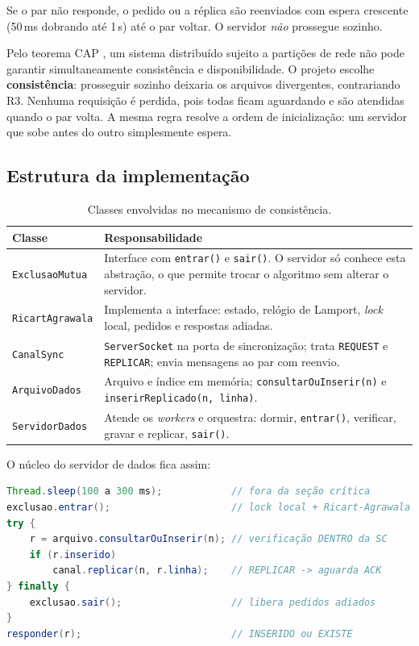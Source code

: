 \documentclass[11pt,a4paper]{article}
\newcommand{\msg}[1]{\texttt{#1}}
\newcommand{\classe}[1]{\texttt{#1}}
\begin{document}
Se o par não responde, o pedido ou a réplica são reenviados com espera crescente
(50\,ms dobrando até 1\,s) até o par voltar. O servidor \emph{não} prossegue
sozinho.

Pelo teorema CAP \cite{brewer2000,gilbert2002}, um sistema distribuído sujeito a
partições de rede não pode garantir simultaneamente consistência e disponibilidade.
O projeto escolhe \textbf{consistência}: prosseguir sozinho deixaria os arquivos
divergentes, contrariando R3. Nenhuma requisição é perdida, pois todas ficam
aguardando e são atendidas quando o par volta. A mesma regra resolve a ordem de
inicialização: um servidor que sobe antes do outro simplesmente espera.

\subsection{Estrutura da implementação}

\begin{table}[H]
\centering
\caption{Classes envolvidas no mecanismo de consistência.}
\begin{tabularx}{\textwidth}{@{}lX@{}}
\toprule
\textbf{Classe} & \textbf{Responsabilidade} \\
\midrule
\classe{ExclusaoMutua}      & Interface com \texttt{entrar()} e \texttt{sair()}. O servidor só conhece esta abstração, o que permite trocar o algoritmo sem alterar o servidor. \\
\classe{RicartAgrawala}     & Implementa a interface: estado, relógio de Lamport, \emph{lock} local, pedidos e respostas adiadas. \\
\classe{CanalSync}          & \classe{ServerSocket} na porta de sincronização; trata \msg{REQUEST} e \msg{REPLICAR}; envia mensagens ao par com reenvio. \\
\classe{ArquivoDados}       & Arquivo e índice em memória; \texttt{consultarOuInserir(n)} e \texttt{inserirReplicado(n, linha)}. \\
\classe{ServidorDados}      & Atende os \emph{workers} e orquestra: dormir, \texttt{entrar()}, verificar, gravar e replicar, \texttt{sair()}. \\
\bottomrule
\end{tabularx}
\end{table}

O núcleo do servidor de dados fica assim:

\begin{lstlisting}[language=Java]
Thread.sleep(100 a 300 ms);            // fora da seção crítica
exclusao.entrar();                     // lock local + Ricart-Agrawala
try {
    r = arquivo.consultarOuInserir(n); // verificação DENTRO da SC
    if (r.inserido)
        canal.replicar(n, r.linha);    // REPLICAR -> aguarda ACK
} finally {
    exclusao.sair();                   // libera pedidos adiados
}
responder(r);                          // INSERIDO ou EXISTE
\end{lstlisting}
\end{document}
